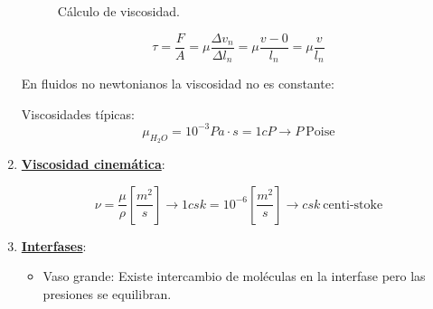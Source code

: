 \begin{enumerate}
\begin{figure}[!ht]
	\caption{Cálculo de viscosidad.}
	\label{fig:viscosidad}
\end{figure}

\[\tau =\frac{F}{A}=\mu \frac{\Delta v_n}{\Delta l_n} =\mu \frac{v - 0}{l_n}= \mu \frac{v}{l_n}\]
	 
	 En fluidos no newtonianos la viscosidad no es constante:
	 
	 
	 Viscosidades típicas:
	 \[\mu_{H_2O}=10^{-3} Pa \cdot s = 1cP \rightarrow P \ \text{Poise}\]
	
	\item \underline{\textbf{Viscosidad cinemática}}:
	
	\[\nu = \frac{\mu}{\rho} \left[\frac{m^2}{s}\right] \rightarrow 1 csk = 10^{-6}\left[\frac{m^2}{s}\right] \rightarrow csk \ \text{centi-stoke}\]
	
	\item \underline{\textbf{Interfases}}: 
	\begin{itemize}
		\item Vaso grande: Existe intercambio de moléculas en la interfase pero las presiones se equilibran.
		 

\end{itemize}
\end{enumerate}
